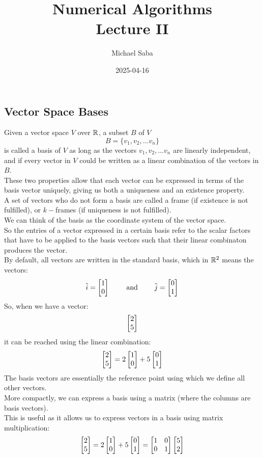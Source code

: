 \documentclass[12pt]{article}
\title{
    \Huge Numerical Algorithms \\
    \Large Lecture II
}
\date{2025-04-16}
\author{Michael Saba}
\begin{document}
\maketitle
\newpage
\setlength{\parindent}{0pt}

\subsection*{Vector Space Bases}

Given a vector space $V$ over $\mathbb{R}$,
a subset $B$ of $V$
\[ B = \{v_1, v_2, \dots v_n \} \]
is called a basis of $V$ as long as the
vectors $v_1, v_2, \dots v_n$
are linearly independent,
and if every vector in $V$ could be written
as a linear combination of the vectors in $B$. \\
These two properties allow that each vector
can be expressed
in terms of the basis vector uniquely,
giving us both a uniqueness
and an existence property. \\

A set of vectors who do not form a basis are
called a frame (if existence is not fulfilled),
or $k-$frames (if uniqueness is not fulfilled). \\

We can think of the basis as the coordinate
system of the vector space. \\
So the entries of a vector expressed in a
certain basis refer to the scalar factors
that have to be applied to the basis vectors
such that their linear combinaton produces
the vector. \\
By default, all vectors are written in the standard
basis, which in $\mathbb{R}^2$ means the vectors:
\[ \hat{i} = \begin{bmatrix} {1} \\ {0} \end{bmatrix} \qquad \text{ and }
\qquad \hat{j} = \begin{bmatrix} {0} \\ {1} \end{bmatrix} \]
So, when we have a vector:
\[ \begin{bmatrix} {2}\\{5} \end{bmatrix} \]
it can be reached using the linear combination:
\[ \begin{bmatrix} {2}\\{5} \end{bmatrix} = 2 \begin{bmatrix} {1}\\{0} \end{bmatrix} 
+ 5 \begin{bmatrix} {0}\\{1} \end{bmatrix} \]
The basis vectors are essentially the reference
point using which we define all other vectors. \\

More compactly, we can express a basis using
a matrix (where the columns are basis vectors). \\
This is useful as it allows us to express
vectors in a basis using matrix multiplication:
\[ \begin{bmatrix} {2}\\{5} \end{bmatrix} = 2 \begin{bmatrix} {1}\\{0} \end{bmatrix} 
+ 5 \begin{bmatrix} {0}\\{1} \end{bmatrix}
= \begin{bmatrix} {1}&{0}\\{0}&{1} \end{bmatrix} \begin{bmatrix} {5}\\{2} \end{bmatrix} \] \\
\end{document}
